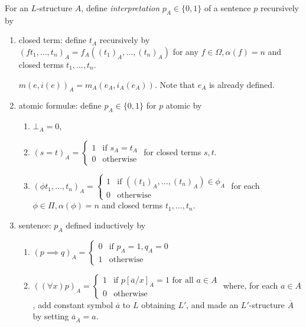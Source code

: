 \documentclass[a4paper]{article}
\begin{document}
\begin{definition}[Interpretation]
  For an \(L\)-structure \(A\), define \emph{interpretation} \(p_A \in \{0, 1\}\) of a sentence \(p\) recursively by
  \begin{enumerate}
  \item closed term: define \(t_A\) recursively by \((ft_1, \dots, t_n)_A = f_A((t_1)_A, \dots, (t_n)_A)\) for any \(f \in \Omega, \alpha(f) = n\) and closed terms \(t_1, \dots, t_n\).
    \begin{eg}
      \(m(e, i(e))_A = m_A(e_A, i_A(e_A))\). Note that \(e_A\) is already defined.
    \end{eg}
  \item atomic formulæ: define \(p_A \in \{0, 1\}\) for \(p\) atomic by
    \begin{enumerate}
    \item \(\bot_A = 0\),
    \item \((s = t)_A = \begin{cases} 1 & \text{if } s_A = t_A \\ 0 & \text{otherwise} \end{cases}\) for closed terms \(s, t\).
    \item \((\phi t_1, \dots, t_n)_A = \begin{cases} 1 & \text{if } ((t_1)_A, \dots, (t_n)_A) \in \phi_A \\ 0 & \text{otherwise} \end{cases}\) for each \(\phi \in \Pi, \alpha(\phi) = n\) and closed terms \(t_1, \dots, t_n\).
    \end{enumerate}
  \item sentence: \(p_A\) defined inductively by
    \begin{enumerate}
    \item \((p \implies q)_A = \begin{cases} 0 & \text{if } p_A = 1, q_A = 0 \\ 1 & \text{otherwise} \end{cases}\)
    \item \(((\forall x) p)_A = \begin{cases} 1 & \text{if } p[\overline a/x]_{\overline A} = 1 \text{ for all } a \in A \\ 0 & \text{otherwise} \end{cases}\) where, for each \(a \in A\), add constant symbol \(\overline a\) to \(L\) obtaining \(L'\), and made an \(L'\)-structure \(\overline A\) by setting \(\overline a_{\overline A} = a\).
    \end{enumerate}
  \end{enumerate}
\end{definition}
\end{document}
